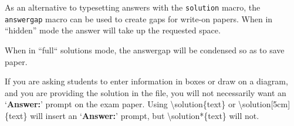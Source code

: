 \documentclass[12pt,a4paper]{article} %
\begin{document}
\begin{question}{5}
As an alternative to typesetting answers with the \texttt{solution} macro, the \texttt{answergap} macro can be used to create gaps for write-on papers. When in ``hidden'' mode the answer will take up the requested space.

When in ``full`` solutions mode, the answergap will be condensed so as to save paper.
\answergap{15cm}
\end{question}

\begin{question}{5} 
If you are asking students to enter information in boxes or draw on a diagram, and you are providing the solution in the file, you will not necessarily want an `{\bf Answer:}' prompt on the exam paper. Using \textbackslash solution\{text\} or \textbackslash solution[5cm]\{text\} will insert an `{\bf Answer:}' prompt, but \textbackslash solution*\{text\} will not.\\
\end{question}


\end{document}
